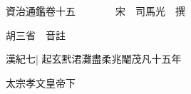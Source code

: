 






























































資治通鑑卷十五　　　　宋　司馬光　撰

胡三省　音註

漢紀七|{
	起玄黓涒灘盡柔兆閹茂凡十五年}


太宗孝文皇帝下

